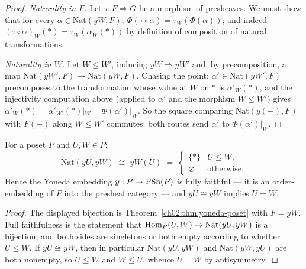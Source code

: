 \begin{proof}
\emph{Naturality in $F$.} Let $\tau : F \Rightarrow G$ be a morphism
of presheaves. We must show that for every
$\alpha \in \mathrm{Nat}(yW, F)$,
$\Phi(\tau \circ \alpha) = \tau_W(\Phi(\alpha))$; and indeed
$(\tau \circ \alpha)_W(\ast) = \tau_W(\alpha_W(\ast))$ by definition
of composition of natural transformations.

\emph{Naturality in $W$.} Let $W \le W'$, inducing
$yW \Rightarrow yW'$ and, by precomposition, a map
$\mathrm{Nat}(yW', F) \to \mathrm{Nat}(yW, F)$. Chasing the point:
$\alpha' \in \mathrm{Nat}(yW', F)$ precomposes to the transformation
whose value at $W$ on $\ast$ is $\alpha'_W(\ast)$, and the injectivity
computation above (applied to $\alpha'$ and the morphism $W \le W'$)
gives $\alpha'_W(\ast) = \alpha'_{W'}(\ast)|_W = \Phi(\alpha')|_W$.
So the square comparing $\mathrm{Nat}(y(-), F)$ with $F(-)$ along
$W \le W'$ commutes: both routes send $\alpha'$ to
$\Phi(\alpha')|_W$.
\end{proof}

\begin{corollary}\label{ch02:cor:yoneda-poset}
For a poset $P$ and $U, W \in P$:
\[
\mathrm{Nat}(yU, yW) \;\cong\; yW(U) \;=\;
\begin{cases}
\{\ast\} & U \le W,\\
\varnothing & \text{otherwise.}
\end{cases}
\]
Hence the Yoneda embedding $y : P \to \mathrm{PSh}(P)$ is fully faithful ---
it is an order-embedding of $P$ into the presheaf category --- and
$yU \cong yW$ implies $U = W$.
\end{corollary}

\begin{proof}
The displayed bijection is Theorem~\ref{ch02:thm:yoneda-poset} with
$F = yW$. Full faithfulness is the statement that
$\mathrm{Hom}_P(U, W) \to \mathrm{Nat}(yU, yW)$ is a bijection, and both sides
are singletons or both empty according to whether $U \le W$. If
$yU \cong yW$, then in particular $\mathrm{Nat}(yU, yW)$ and
$\mathrm{Nat}(yW, yU)$ are both nonempty, so $U \le W$ and $W \le U$,
whence $U = W$ by antisymmetry.
\end{proof}

